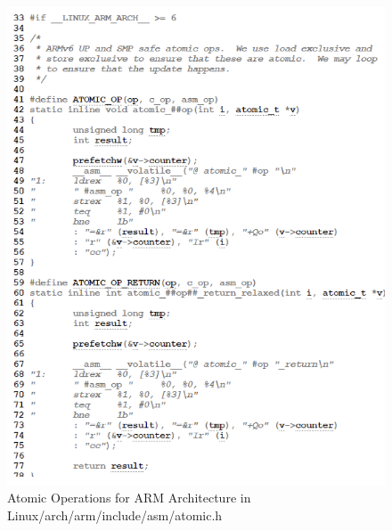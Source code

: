 \documentclass[10pt]{sigplanconf}
\begin{document}
\begin{figure}[h!]
  \centering
  \includegraphics[scale=0.45]{ARM_atomic.png}
  \caption{Atomic Operations for ARM Architecture in Linux/arch/arm/include/asm/atomic.h}
  \label{fig:ec}
\end{figure}

\vspace{100pt}
\end{document}
